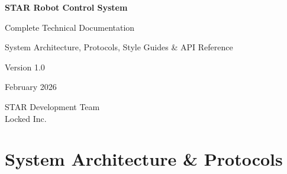 \documentclass[11pt,letterpaper]{article}
\begin{document}

\begin{titlepage}
\centering
\vspace*{2cm}

{\Huge\bfseries STAR Robot Control System\par}
\vspace{0.5cm}
{\LARGE Complete Technical Documentation\par}
\vspace{1cm}
{\Large System Architecture, Protocols, Style Guides \& API Reference\par}

\vfill

{\large Version 1.0\par}
{\large February 2026\par}

\vfill

{\normalsize STAR Development Team\\ Locked Inc.\par}
\end{titlepage}

\tableofcontents
\newpage

\part{System Architecture \& Protocols}












\end{document}
